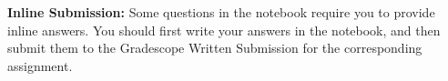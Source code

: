\vspace{.25\baselineskip}


{\bf Inline Submission:}
Some questions in the notebook require you to provide inline answers. You should first write your answers in the notebook, and then submit them to the Gradescope Written Submission for the corresponding assignment.



